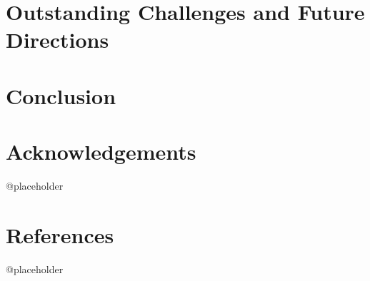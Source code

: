 \documentclass{article}
\begin{document}
\section{Outstanding Challenges and Future Directions}


\section{Conclusion}


\section{Acknowledgements}
@placeholder

\section{References}
@placeholder
\end{document}
